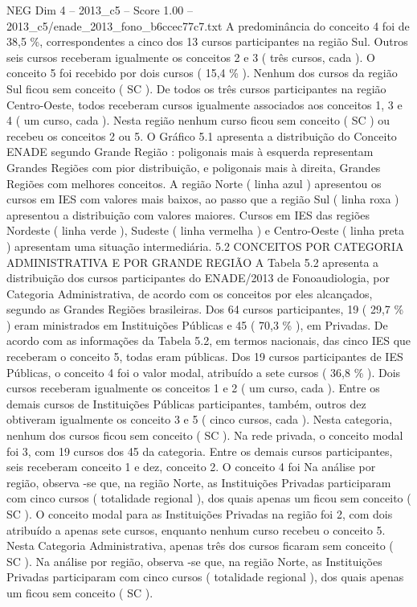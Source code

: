 \begin{textsample}{NEG Dim 4 – 2013\_c5 – Score 1.00 – 2013\_c5/enade\_2013\_fono\_b6ccec77c7.txt}
A predominância do conceito 4 foi de 38,5 \%, correspondentes a cinco dos 13 cursos participantes na região Sul.
Outros seis cursos receberam igualmente os conceitos 2 e 3 ( três cursos, cada ).
O conceito 5 foi recebido por dois cursos ( 15,4 \% ).
Nenhum dos cursos da região Sul ficou sem conceito ( SC ).
De todos os três cursos participantes na região Centro-Oeste, todos receberam cursos igualmente associados aos conceitos 1, 3 e 4 ( um curso, cada ).
Nesta região nenhum curso ficou sem conceito ( SC ) ou recebeu os conceitos 2 ou 5.
O Gráfico 5.1 apresenta a distribuição do Conceito ENADE segundo Grande Região : poligonais mais à esquerda representam Grandes Regiões com pior distribuição, e poligonais mais à direita, Grandes Regiões com melhores conceitos.
A região Norte ( linha azul ) apresentou os cursos em IES com valores mais baixos, ao passo que a região Sul ( linha roxa ) apresentou a distribuição com valores maiores.
Cursos em IES das regiões Nordeste ( linha verde ), Sudeste ( linha vermelha ) e Centro-Oeste ( linha preta ) apresentam uma situação intermediária. 5.2 CONCEITOS POR CATEGORIA ADMINISTRATIVA E POR GRANDE REGIÃO A Tabela 5.2 apresenta a distribuição dos cursos participantes do ENADE/2013 de Fonoaudiologia, por Categoria Administrativa, de acordo com os conceitos por eles alcançados, segundo as Grandes Regiões brasileiras.
Dos 64 cursos participantes, 19 ( 29,7 \% ) eram ministrados em Instituições Públicas e 45 ( 70,3 \% ), em Privadas.
De acordo com as informações da Tabela 5.2, em termos nacionais, das cinco IES que receberam o conceito 5, todas eram públicas.
Dos 19 cursos participantes de IES Públicas, o conceito 4 foi o valor modal, atribuído a sete cursos ( 36,8 \% ).
Dois cursos receberam igualmente os conceitos 1 e 2 ( um curso, cada ).
Entre os demais cursos de Instituições Públicas participantes, também, outros dez obtiveram igualmente os conceito 3 e 5 ( cinco cursos, cada ).
Nesta categoria, nenhum dos cursos ficou sem conceito ( SC ).
Na rede privada, o conceito modal foi 3, com 19 cursos dos 45 da categoria.
Entre os demais cursos participantes, seis receberam conceito 1 e dez, conceito 2.
O conceito 4 foi Na análise por região, observa -se que, na região Norte, as Instituições Privadas participaram com cinco cursos ( totalidade regional ), dos quais apenas um ficou sem conceito ( SC ).
O conceito modal para as Instituições Privadas na região foi 2, com dois atribuído a apenas sete cursos, enquanto nenhum curso recebeu o conceito 5.
Nesta Categoria Administrativa, apenas três dos cursos ficaram sem conceito ( SC ).
Na análise por região, observa -se que, na região Norte, as Instituições Privadas participaram com cinco cursos ( totalidade regional ), dos quais apenas um ficou sem conceito ( SC ).

\end{textsample}
